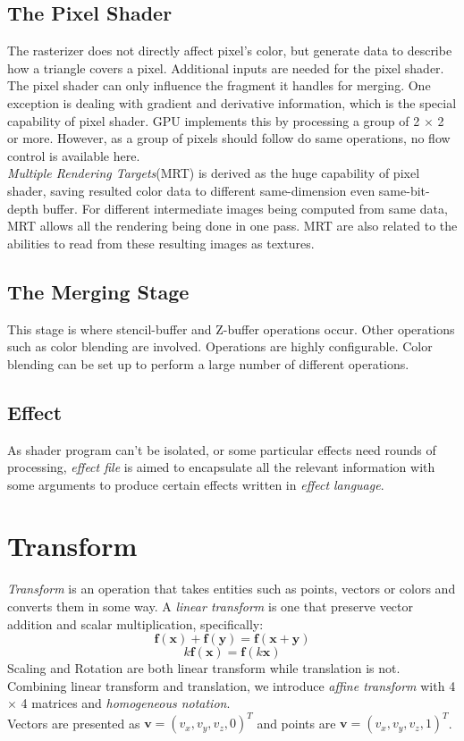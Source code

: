 \documentclass[10pt, a4paper]{article}
\begin{document}
        \subsection{The Pixel Shader} 
            The rasterizer does not directly affect pixel's color, but generate data to describe how a triangle covers a pixel. Additional inputs are needed for the pixel shader. The pixel shader can only influence the fragment it handles for merging. One exception is dealing with gradient and derivative information, which is the special capability of pixel shader. GPU implements this by processing a group of 2 $\times$ 2 or more. However, as a group of pixels should follow do same operations, no flow control is available here.\\
            \indent\emph{Multiple Rendering Targets}(MRT) is derived as the huge capability of pixel shader, saving resulted color data to different same-dimension even same-bit-depth buffer. For different intermediate images being computed from same data, MRT allows all the rendering being done in one pass. MRT are also related to the abilities to read from these resulting images as textures.

        \subsection{The Merging Stage}
            This stage is where stencil-buffer and Z-buffer operations occur. Other operations such as color blending are involved. Operations are highly configurable. Color blending can be set up to perform a large number of different operations. 
        
        \subsection{Effect}
            As shader program can't be isolated, or some particular effects need rounds of processing, \emph{effect file} is aimed to encapsulate all the relevant information with some arguments to produce certain effects written in \emph{effect language}. 

    \section{Transform} 
        \emph{Transform} is an operation that takes entities such as points, vectors or colors and converts them in some way. A \emph{linear transform} is one that preserve vector addition and scalar multiplication, specifically:$$\textbf{f}(\textbf{x}) + \textbf{f}(\textbf{y}) = \textbf{f}(\textbf{x} + \textbf{y})$$ $$k\textbf{f}(\textbf{x}) = \textbf{f}(k\textbf{x})$$ \indent Scaling and Rotation are both linear transform while translation is not. Combining linear transform and translation, we introduce \emph{affine transform} with 4 $\times$ 4 matrices and \emph{homogeneous notation}. \\
        \indent Vectors are presented as $\textbf{v} = (v_x, v_y, v_z, 0)^T$ and points are $\textbf{v} = (v_x, v_y, v_z, 1)^T$.
        
\end{document}
